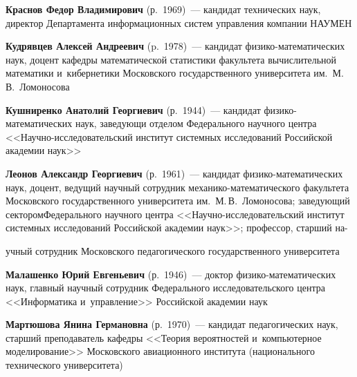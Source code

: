 \begin{multicols}{2}
 \noindent
\textbf{Краснов Федор Владимирович} (р.\ 1969)~--- 
кандидат технических наук, директор Департамента информационных
систем управления компании \mbox{НАУМЕН}

 \vspace*{4pt}
 
\noindent
\textbf{Кудрявцев Алексей Андреевич} (p.\ 1978)~--- 
кандидат фи\-зи\-ко-ма\-те\-ма\-ти\-че\-ских наук, доцент кафедры 
математической статистики факультета вычислительной математики 
и~кибернетики Московского государственного университета им.\ М.\,В.~Ломоносова

 \vspace*{4pt}
 
 \noindent
\textbf{Кушниренко Анатолий Георгиевич} (р.\ 1944)~--- 
кандидат фи\-зи\-ко-ма\-те\-ма\-ти\-че\-ских наук, заведующи %
 отделом 
Федерального научного центра <<На\-уч\-но-ис\-сле\-до\-ва\-тель\-ский 
институт системных исследований Российской академии наук>> %

 
 \noindent
\textbf{Леонов Александр Георгиевич} (р.\ 1961)~--- 
кандидат фи\-зи\-ко-ма\-те\-ма\-ти\-че\-ских наук, доцент, ведущий 
научный сотрудник ме\-ха\-ни\-ко-ма\-те\-ма\-ти\-че\-ско\-го факультета 
Московского государственного университета им.\ М.\,В.~Ломоносова; 
заведующий сектором\linebreak Федерального научного центра 
<<На\-уч\-но-ис\-сле\-до\-ва\-тель\-ский 
институт системных исследований Российской академии наук>>; 
профессор, старший на-\linebreak\vspace*{-12pt}

\pagebreak

\noindent
учный сотрудник Московского 
педагогического государственного университета %

 
 \noindent
\textbf{Малашенко Юрий Евгеньевич} (р.\ 1946)~--- 
доктор фи\-зи\-ко-ма\-те\-ма\-ти\-че\-ских наук, главный научный 
сотрудник Федерального исследовательского центра <<Информатика и~управ\-ле\-ние>>
Российской академии наук

 
 \noindent
\textbf{Мартюшова Янина Германовна} (р.\ 1970)~--- 
кандидат педагогических наук, старший преподаватель ка\-фед\-ры 
<<Тео\-рия вероятностей и~компьютерное моделирование>>
Московского авиационного института (национального технического университета)


\end{multicols}
